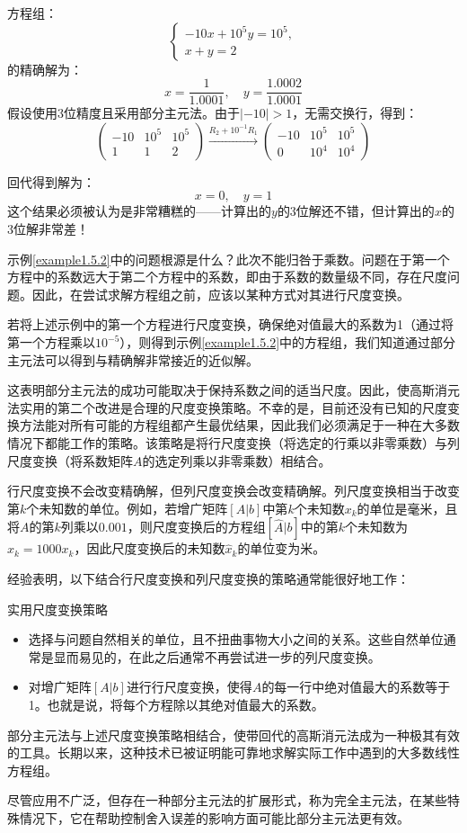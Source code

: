 \begin{example}
\label{example1.5.2}
方程组：
$$
\begin{cases} 
-10x + 10^5y = 10^5, \\
x + y = 2
\end{cases}
$$
的精确解为：
$$
x = \frac{1}{1.0001}, \quad y = \frac{1.0002}{1.0001}
$$
假设使用3位精度且采用部分主元法。由于$|-10| > 1$，无需交换行，得到：
$$
\left(\begin{array}{cc|c} 
-10 & 10^5 & 10^5 \\
1 & 1 & 2
\end{array}\right) \xrightarrow{R_2 + 10^{-1} R_1} \left(\begin{array}{cc|c} 
-10 & 10^5 & 10^5 \\
0 & 10^4 & 10^4
\end{array}\right)
$$
\end{example}
回代得到解为：
$$x=0, \quad y=1$$
这个结果必须被认为是非常糟糕的——计算出的$y$的3位解还不错，但计算出的$x$的3位解非常差！

示例\ref{example1.5.2}中的问题根源是什么？此次不能归咎于乘数。问题在于第一个方程中的系数远大于第二个方程中的系数，即由于系数的数量级不同，存在尺度问题。因此，在尝试求解方程组之前，应该以某种方式对其进行尺度变换。

若将上述示例中的第一个方程进行尺度变换，确保绝对值最大的系数为1（通过将第一个方程乘以$10^{-5}$），则得到示例\ref{example1.5.2}中的方程组，我们知道通过部分主元法可以得到与精确解非常接近的近似解。

这表明部分主元法的成功可能取决于保持系数之间的适当尺度。因此，使高斯消元法实用的第二个改进是合理的尺度变换策略。不幸的是，目前还没有已知的尺度变换方法能对所有可能的方程组都产生最优结果，因此我们必须满足于一种在大多数情况下都能工作的策略。该策略是将行尺度变换（将选定的行乘以非零乘数）与列尺度变换（将系数矩阵$A$的选定列乘以非零乘数）相结合。

行尺度变换不会改变精确解，但列尺度变换会改变精确解。列尺度变换相当于改变第$k$个未知数的单位。例如，若增广矩阵$[A|b]$中第$k$个未知数$x_k$的单位是毫米，且将$A$的第$k$列乘以$0.001$，则尺度变换后的方程组$[\hat{A}|b]$中的第$k$个未知数为$\hat{x}_k = 1000x_k$，因此尺度变换后的未知数$\hat{x}_k$的单位变为米。

经验表明，以下结合行尺度变换和列尺度变换的策略通常能很好地工作：

\begin{bluebox}{实用尺度变换策略}
\begin{itemize}
    \item 选择与问题自然相关的单位，且不扭曲事物大小之间的关系。这些自然单位通常是显而易见的，在此之后通常不再尝试进一步的列尺度变换。
    \item 对增广矩阵$[A|b]$进行行尺度变换，使得$A$的每一行中绝对值最大的系数等于1。也就是说，将每个方程除以其绝对值最大的系数。
\end{itemize}
部分主元法与上述尺度变换策略相结合，使带回代的高斯消元法成为一种极其有效的工具。长期以来，这种技术已被证明能可靠地求解实际工作中遇到的大多数线性方程组。
\end{bluebox}
尽管应用不广泛，但存在一种部分主元法的扩展形式，称为完全主元法，在某些特殊情况下，它在帮助控制舍入误差的影响方面可能比部分主元法更有效。


